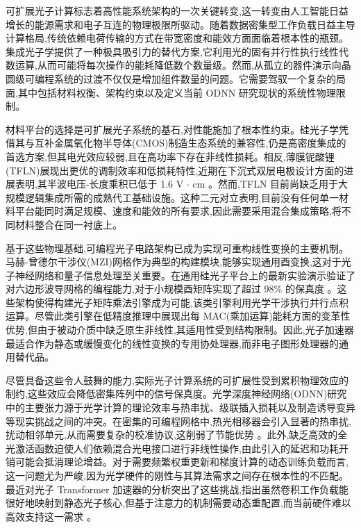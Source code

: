 \documentclass[11pt]{article}
\begin{document}
可扩展光子计算标志着高性能系统架构的一次关键转变,这一转变由人工智能日益增长的能源需求和电子互连的物理极限所驱动。随着数据密集型工作负载日益主导计算格局,传统依赖电荷传输的方式在带宽密度和能效方面面临着根本性的瓶颈。集成光子学提供了一种极具吸引力的替代方案,它利用光的固有并行性执行线性代数运算,从而可能将每次操作的能耗降低数个数量级。然而,从孤立的器件演示向晶圆级可编程系统的过渡不仅仅是增加组件数量的问题。它需要驾驭一个复杂的局面,其中包括材料权衡、架构约束以及定义当前 ODNN 研究现状的系统性物理限制。

材料平台的选择是可扩展光子系统的基石,对性能施加了根本性约束。硅光子学凭借其与互补金属氧化物半导体(CMOS)制造生态系统的兼容性,仍是高密度集成的首选方案,但其电光效应较弱,且在高功率下存在非线性损耗。相反,薄膜铌酸锂(TFLN)展现出更优的调制效率和低损耗特性,近期在下沉式双层电极设计方面的进展表明,其半波电压-长度乘积已低于 1.6 V \(\cdot\) cm \citep{doi_10_3390_photonics12111129_03f4b6cd}。然而,TFLN 目前尚缺乏用于大规模逻辑集成所需的成熟代工基础设施。这种二元对立表明,目前没有任何单一材料平台能同时满足规模、速度和能效的所有要求,因此需要采用混合集成策略,将不同材料整合在同一衬底上。

基于这些物理基础,可编程光子电路架构已成为实现可重构线性变换的主要机制。马赫-曾德尔干涉仪(MZI)网格作为典型的构建模块,能够实现通用酉变换,这对于光子神经网络和量子信息处理至关重要。在通用硅光子平台上的最新实验演示验证了对六边形波导网格的编程能力,对于小规模酉矩阵实现了超过 98\% 的保真度 \citep{doi_10_1063_5_0235712_fb28986d}。这些架构使得构建光子矩阵乘法引擎成为可能,该类引擎利用光学干涉执行并行点积运算。尽管此类引擎在低精度推理中展现出每 MAC(乘加运算)能耗方面的变革性优势,但由于被动介质中缺乏原生非线性,其适用性受到结构限制。因此,光子加速器最适合作为静态或缓慢变化的线性变换的专用协处理器,而非电子图形处理器的通用替代品。

尽管具备这些令人鼓舞的能力,实际光子计算系统的可扩展性受到累积物理效应的制约,这些效应会降低密集阵列中的信号保真度。光学深度神经网络(ODNN)研究中的主要张力源于光学计算的理论效率与热串扰、级联插入损耗以及制造诱导变异等现实挑战之间的冲突。在密集的可编程网格中,热光相移器会引入显著的热串扰,扰动相邻单元,从而需要复杂的校准协议,这削弱了节能优势 \citep{doi_10_1109_access_2020_3013116_8fec1fb2}。此外,缺乏高效的全光激活函数迫使人们依赖混合光电接口进行非线性操作,由此引入的延迟和功耗开销可能会抵消理论增益。对于需要频繁权重更新和梯度计算的动态训练负载而言,这一问题尤为严峻,因为光学硬件的刚性与其算法需求之间存在根本性的不匹配。最近对光子 Transformer 加速器的分析突出了这些挑战,指出虽然卷积工作负载能很好地映射到静态光子核心,但基于注意力的机制需要动态重配置,而当前硬件难以高效支持这一需求 \citep{doi_10_1109_hpca57654_2024_00059_f488ee7a}。
\end{document}
